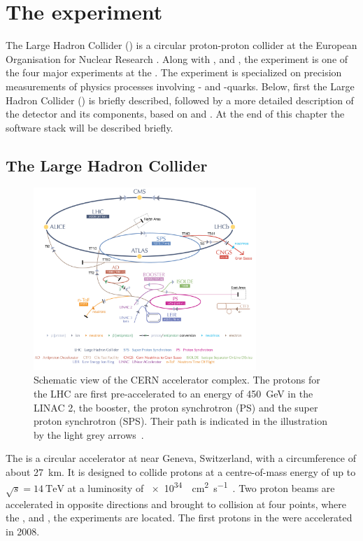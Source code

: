 \chapter{The \lhcb experiment}

The Large Hadron Collider (\lhc) is a circular proton-proton collider at the European Organisation for Nuclear Research \cern.
Along with \atlas, \cms and \alice, the \lhcb experiment is one of the four major experiments at the \lhc.
The experiment is specialized on precision measurements of physics processes involving \bquark- and \cquark-quarks.
Below, first the Large Hadron Collider (\lhc) is briefly described, followed by a more detailed description of the \lhcb detector and its components, based on \cite{Alves:2008zz} and \cite{Aaij:2014jba}.
At the end of this chapter the \lhcb software stack will be described briefly.

\section{The Large Hadron Collider}

\begin{figure}[tbp]
    \centering
    \includegraphics[width=0.75\textwidth]{05lhcb/figs/cern.pdf}
    \caption{Schematic view of the CERN accelerator complex.
    The protons for the LHC are first pre-accelerated to an energy of \SI{450}{\giga\electronvolt} in the LINAC 2, the booster, the proton synchrotron (PS) and the super proton synchrotron (SPS).
    Their path is indicated in the illustration by the light grey arrows~\cite{Christiane:1260465}.}
    \label{fig:CernAccelerators}
\end{figure}
The \lhc is a circular accelerator at \cern near Geneva, Switzerland, with a circumference of about \SI{27}{\kilo\metre}.
It is designed to collide protons at a centre-of-mass energy of up to $\sqrt{s} = \SI{14}{\tera\electronvolt}$ at a luminosity of \SI{e34}{\per\cm\squared\per\second}~\cite{Bruening:782076}.
Two proton beams are accelerated in opposite directions and brought to collision at four points, where the \atlas, \cms and \alice, the \lhcb experiments are located.
The first protons in the \lhc were accelerated in \num{2008}.


